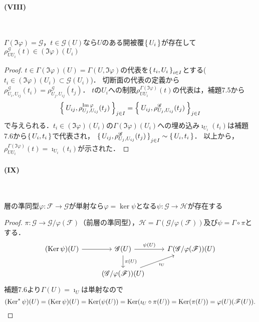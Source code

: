 \paragraph{(VIII)}~
\begin{screen}
  $\Gamma(\Im\varphi) = \mathscr{G}$，$t \in \mathscr{G}(U)$なら$U$のある開被覆$\set{U_i}$が存在して$\rho_{UU_i}^\mathscr{G}(t) \in (\Im\varphi)(U_i)$
\end{screen}
\begin{proof}
  $t \in \Gamma(\Im\varphi)(U) = \Gamma(U, \Im\varphi)$の代表を$\set{t_i, U_i}_{i\in I}$とする($t_i \in (\Im\varphi)(U_i) \subset \mathscr{G}(U_i)$)．
  切断面の代表の定義から$\rho_{U_i, U_{ij}}^\mathscr{G}(t_i) = \rho_{U_j, U_{ij}}^\mathscr{G}(t_j)$．
  $t$の$U_i$への制限$\rho_{UU_i}^{\Gamma(\Im\varphi)}(t)$の代表は，補題7.5から
  \[
  \Set{U_{ij}, \rho_{U_j, U_{ij}}^{\operatorname{Im}\varphi}(t_j)}_{j\in I} = \Set{U_{ij}, \rho_{U_j, U_{ij}}^\mathscr{G}(t_j)}_{j\in I}
  \]
  で与えられる．$t_i \in (\Im\varphi)(U_i)$の$\Gamma(\Im\varphi)(U_i)$への埋め込み$\imath_{U_i}(t_i)$は補題7.6から$\set{U_i, t_i}$で代表され，
  $\set{U_{ij}, \rho_{U_j, U_{ij}}^\mathscr{G}(t_j)}_{j\in I} \sim \set{U_i, t_i}$．
  以上から，$\rho_{UU_i}^{\Gamma(\Im\varphi)}(t) = \imath_{U_i}(t_i)$が示された．
\end{proof}

\paragraph{(IX)}~
\begin{screen}
  層の準同型$\varphi\colon\mathscr{F}\to\mathscr{G}$が単射なら$\varphi = \ker\psi$となる$\psi\colon\mathscr{G}\to\mathscr{H}$が存在する
\end{screen}
\begin{proof}
  $\pi\colon\mathscr{G}\to\mathscr{G}/\varphi(\mathscr{F})$（前層の準同型），$\mathscr{H} = \varGamma(\mathscr{G}/\varphi(\mathscr{F}))$及び$\psi = \varGamma\circ\pi$とする．
  \[
  \begin{tikzcd}
    (\Ker\psi)(U) \arrow[r] & \mathscr{G}(U) \arrow[r, "\psi(U)"]\arrow[d, "\pi(U)"] & \varGamma(\mathscr{G}/\varphi(\mathscr{F}))(U) \\
    & (\mathscr{G}/\varphi(\mathscr{F}))(U) \arrow[ru, "\imath_U"'] &
  \end{tikzcd}
  \]
  補題7.6より$\varGamma(U) = \imath_U$は単射なので
  \[
  (\operatorname{Ker}^\ast\psi)(U) = (\operatorname{Ker}\psi)(U) = \operatorname{Ker}(\psi(U)) = \operatorname{Ker}(\imath_U \circ \pi(U))
  = \operatorname{Ker}(\pi(U)) = \varphi(U)(\mathscr{F}(U)) .
  \]
\end{proof}

